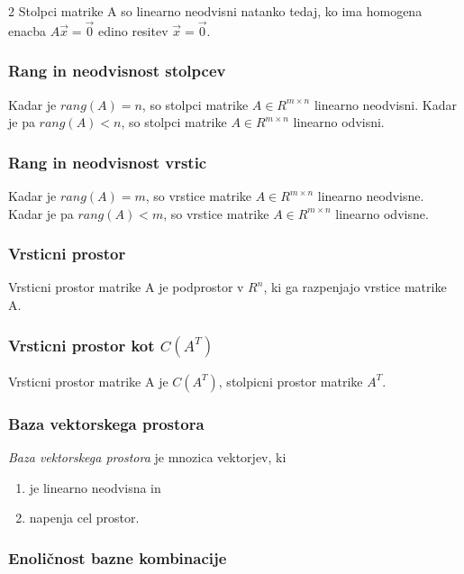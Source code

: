 \documentclass{article}
\begin{document}
\begin{multicols}{2}
	Stolpci matrike A so linearno neodvisni natanko tedaj, ko ima homogena enacba
	$A\vec{x} = \vec{0}$ edino resitev $\vec{x} = \vec{0}$.

	\subsubsection{Rang in neodvisnost stolpcev}

	Kadar je $rang(A) = n$, so stolpci matrike $A \in R^{m \times n}$ linearno
	neodvisni. Kadar je pa $rang(A) < n$, so stolpci matrike $A \in R^{m \times n}$ linearno odvisni.

	\subsubsection{Rang in neodvisnost vrstic}

	Kadar je $rang(A) = m$, so vrstice matrike $A \in R^{m \times n}$ linearno neodvisne.
	Kadar je pa $rang(A) < m$, so vrstice matrike $A \in R^{m \times n}$ linearno odvisne.

	\subsubsection{Vrsticni prostor}

	Vrsticni prostor matrike A je podprostor v $R^{n}$, ki ga razpenjajo vrstice matrike A.

	\subsubsection{Vrsticni prostor kot $C(A^T)$}

	Vrsticni prostor matrike A je $C(A^{T})$, stolpicni prostor matrike $A^{T}$.

	\subsubsection{Baza vektorskega prostora}

	\textit{Baza vektorskega prostora} je mnozica vektorjev, ki
	\begin{enumerate}
		\item je linearno neodvisna in
		\item napenja cel prostor.
	\end{enumerate}

	\subsubsection{Enoličnost bazne kombinacije}


\end{multicols}
\end{document}
